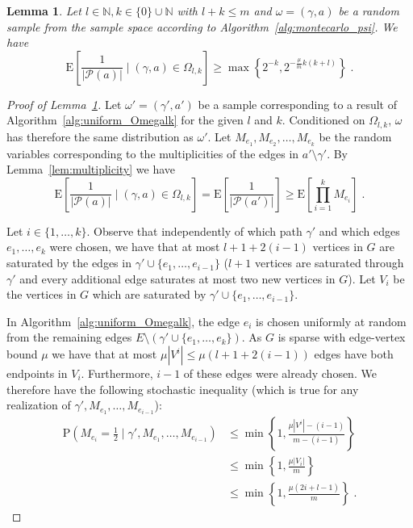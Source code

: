 \documentclass{article}
\newtheorem{lemma}{Lemma}
\newcommand\ex{\mathrm{E}}
\newcommand\prob{\mathrm{P}}
\begin{document}
\begin{lemma}\label{lem:bound_Omegalk}
Let $l\in \mathbb{N}, k\in \{0\}\cup\mathbb{N}$
with $l+k\leq m$ and $\omega=(\gamma,a)$ be
a random sample from the sample space
according to Algorithm~\ref{alg:montecarlo_psi}. We have
\begin{equation*}
\ex\left[\frac{1}{|\mathcal{P}(a)|} \mid
  (\gamma,a)\in\Omega_{l,k} \right]\geq \max\left\{2^{-k},2^{-\frac{\mu}{m}k(k+l)}\right\}\;.
\end{equation*}
\end{lemma}

\begin{proof}[Proof of Lemma~\ref{lem:bound_Omegalk}]
Let $\omega'=(\gamma',a')$ be a sample corresponding
to a result of Algorithm~\ref{alg:uniform_Omegalk} for the
given $l$ and $k$.
Conditioned on $\Omega_{l,k}$, $\omega$ has therefore the same
distribution as $\omega'$.
Let $M_{e_1},M_{e_2},\dots,M_{e_k}$ be the random variables
corresponding to the multiplicities of the edges in
$a'\setminus\gamma'$. By Lemma~\ref{lem:multiplicity} we
have
\begin{equation}\label{eq:ex_multiplicities}
\ex\left[\frac{1}{|\mathcal{P}(a)|} \mid
  (\gamma,a)\in\Omega_{l,k} \right]=\ex\left[\frac{1}{|\mathcal{P}(a')|}\right]
\geq \ex\left[\prod_{i=1}^k M_{e_i}\right]\;.
\end{equation}

Let $i\in \{1,\dots,k\}$. Observe that independently of which
path $\gamma'$ and which edges $e_{1},\dots,e_{k}$ were
chosen, we have that at most $l+1+2(i-1)$ vertices in
$G$ are saturated by the edges in $\gamma' \cup
\{e_{1},\dots,e_{i-1}\}$ ($l+1$ vertices are saturated
through $\gamma'$ and every additional edge saturates at most two
new vertices in $G$). Let $V_i$ be the vertices in $G$ which
are saturated by $\gamma' \cup \{e_{1},\dots,e_{i-1}\}$.

In Algorithm~\ref{alg:uniform_Omegalk}, the edge $e_i$ is chosen
uniformly at random from the remaining edges $E\setminus
(\gamma' \cup \{e_{1},\dots,e_k\})$. As $G$ is sparse
with \mbox{edge-vertex} bound $\mu$ we have that at most $\mu
|V^i|\leq \mu (l+1+2(i-1))$ edges have both
endpoints in $V_i$. Furthermore, $i-1$ of these edges were already
chosen. We therefore have the following stochastic
inequality (which is true for any realization of
$\gamma',M_{e_{1}},\dots,M_{e_{i-1}}$):
\begin{align*}
\prob\left(M_{e_i}=\frac{1}{2} \mid \gamma',
M_{e_{1}},\dots,M_{e_{i-1}}\right) &\leq \min\left\{1,\frac{\mu |V^i|-(i-1)}{m-(i-1)}\right\}\\
&\leq \min\left\{1,\frac{\mu |V_i|}{m}\right\}\\
&\leq \min\left\{1,\frac{\mu(2i+l-1)}{m}\right\}\;.
\end{align*}


\end{proof}
\end{document}
